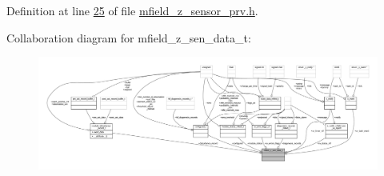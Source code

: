 Definition at line \hyperlink{a00027_source_l00025}{25} of file \hyperlink{a00027_source}{mfield\+\_\+z\+\_\+sensor\+\_\+prv.\+h}.



Collaboration diagram for mfield\+\_\+z\+\_\+sen\+\_\+data\+\_\+t\+:\nopagebreak
\begin{figure}[H]
\begin{center}
\leavevmode
\includegraphics[width=350pt]{d0/d3c/a00971}
\end{center}
\end{figure}

